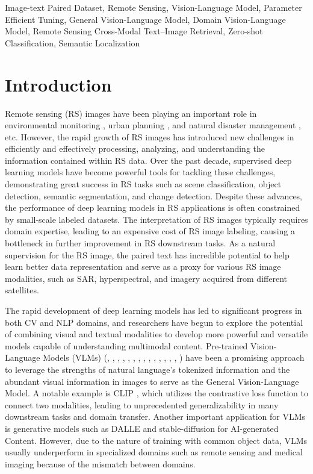 \documentclass[journal]{IEEEtran}
\begin{document}
\begin{IEEEkeywords}
Image-text Paired Dataset, Remote Sensing, Vision-Language Model, Parameter Efficient Tuning, General Vision-Language Model, Domain Vision-Language Model, Remote Sensing Cross-Modal Text–Image Retrieval, Zero-shot Classification, Semantic Localization
\end{IEEEkeywords}




\section{Introduction}
Remote sensing (RS) images have been playing an important role in environmental monitoring \cite{rsen}, urban planning \cite{rsup}, and natural disaster management \cite{rsnda}, etc. However, the rapid growth of RS images has introduced new challenges in efficiently and effectively processing, analyzing, and understanding the information contained within RS data. Over the past decade, supervised deep learning models have become powerful tools for tackling these challenges, demonstrating great success in RS tasks such as scene classification, object detection, semantic segmentation, and change detection. Despite these advances, the performance of deep learning models in RS applications is often constrained by small-scale labeled datasets. The interpretation of RS images typically requires domain expertise, leading to an expensive cost of RS image labeling, causing a bottleneck in further improvement in RS downstream tasks. As a natural supervision for the RS image, the paired text has incredible potential to help learn better data representation and serve as a proxy for various RS image modalities, such as SAR, hyperspectral, and imagery acquired from different satellites. 

The rapid development of deep learning models has led to significant progress in both CV and NLP domains, and researchers have begun to explore the potential of combining visual and textual modalities to develop more powerful and versatile models capable of understanding multimodal content. Pre-trained Vision-Language Models (VLMs) (\cite{clip}, \cite{align}, \cite{visualbert}, \cite{vilt}, \cite{uniter}, \cite{albef}, \cite{oscar}, \cite{coca}, \cite{flamingo}, \cite{florence}, \cite{declip}, \cite{blip}, \cite{blip2}, \cite{beit3}, \cite{kosmos}) have been a promising approach to leverage the strengths of natural language's tokenized information and the abundant visual information in images to serve as the General Vision-Language Model. A notable example is CLIP \cite{clip}, which utilizes the contrastive loss function to connect two modalities, leading to unprecedented generalizability in many downstream tasks and domain transfer. Another important application for VLMs is generative models such as DALLE \cite{dalle} and stable-diffusion \cite{stable-diffusion} for AI-generated Content. However, due to the nature of training with common object data, VLMs usually underperform in specialized domains such as remote sensing \cite{clip} and medical imaging\cite{DAMMFM} because of the mismatch between domains.
\end{document}
